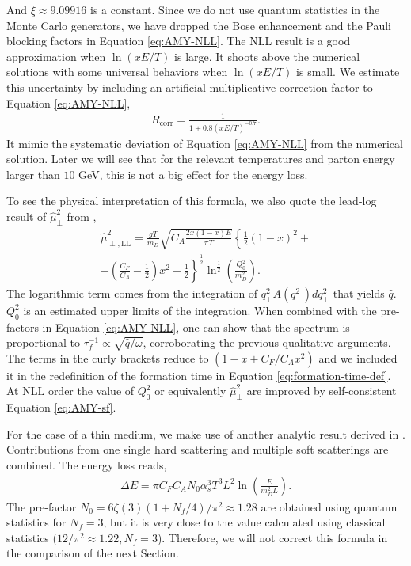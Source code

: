 \documentclass[aps, prc, reprint, amsmath, groupedaddress, nofootinbib]{revtex4-1}
\begin{document}
And $\xi\approx9.09916$ is a constant. 
Since we do not use quantum statistics in the Monte Carlo generators, we have dropped the Bose enhancement and the Pauli blocking factors in Equation \ref{eq:AMY-NLL}.
The NLL result is a good approximation when $\ln(xE/T)$ is large. 
It shoots above the numerical solutions with some universal behaviors when $\ln(xE/T)$ is small.
We estimate this uncertainty by including an artificial multiplicative correction factor to Equation \ref{eq:AMY-NLL}, 
\begin{eqnarray}\label{eq:correction}
R_{\textrm{corr}} = \frac{1}{1+0.8\left(xE/T\right)^{-0.7}}.
\end{eqnarray}
It mimic the systematic deviation of Equation \ref{eq:AMY-NLL} from the numerical solution. 
Later we will see that for the relevant temperatures and parton energy larger than $10$ GeV, this is not a big effect for the energy loss.

To see the physical interpretation of this formula, we also quote the lead-log result of $\hat{\mu}_\perp^2$ from \cite{Arnold:2008zu},
\begin{eqnarray}\label{eq:AMY-LL}
\nonumber
\hat{\mu}_{\perp, \textrm{LL}}^2 = \frac{gT}{m_D} \sqrt{C_A\frac{2x(1-x)E}{\pi T}}\left\{
\frac{1}{2}(1-x)^2 + \right.\\
\left. + \left(\frac{C_F}{C_A} - \frac{1}{2}\right)x^2 + \frac{1}{2}\right\}^{\frac{1}{2}}\ln^{\frac{1}{2}}\left(\frac{Q_0^2}{m_D^2}\right).
\end{eqnarray}
The logarithmic term comes from the integration of $q_\perp^2 A(q_\perp^2)dq_\perp^2$ that yields $\hat{q}$.
$Q_0^2$ is an estimated upper limits of the integration.
When combined with the pre-factors in Equation \ref{eq:AMY-NLL}, one can show that the spectrum is proportional to $\tau_f^{-1} \propto \sqrt{\hat{q}/\omega}$, corroborating the previous qualitative arguments.
The terms in the curly brackets reduce to $(1-x+C_F/C_Ax^2)$ and we included it in the redefinition of the formation time in Equation \ref{eq:formation-time-def}.
At NLL order the value of $Q_0^2$ or equivalently $\hat{\mu}_\perp^2$ are improved by self-consistent Equation \ref{eq:AMY-sf}.

For the case of a thin medium, we make use of another analytic result derived in \cite{Arnold:2009mr}. 
Contributions from one single hard scattering and multiple soft scatterings are combined.
The energy loss reads,
\begin{eqnarray}\label{eq:dE-thin}
\Delta E = \pi C_F C_A N_0 \alpha_s^3 T^3 L^2 \ln\left(\frac{E}{m_D^2 L}\right).
\end{eqnarray}
The pre-factor $N_0 = 6\zeta(3)(1+N_f/4)/\pi^2 \approx 1.28$ 
are obtained using quantum statistics for $N_f=3$, but it is very close to the value calculated using classical statistics ($12/\pi^2 \approx 1.22, N_f=3$).
Therefore, we will not correct this formula in the comparison of the next Section.
\end{document}
